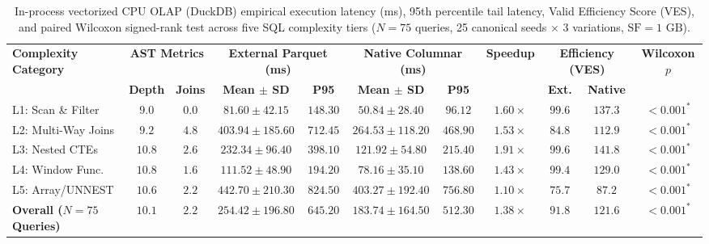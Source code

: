 \documentclass[10pt,a4paper]{article}
\begin{document}
\begin{table}[!t]
\centering
\caption{In-process vectorized CPU OLAP (DuckDB) empirical execution latency (ms), 95th percentile tail latency, Valid Efficiency Score (VES), and paired Wilcoxon signed-rank test across five SQL complexity tiers ($N=75$ queries, 25 canonical seeds $\times$ 3 variations, $\text{SF}=1\text{ GB}$).}
\label{tab:empirical_complexity_results}
\scriptsize
\setlength{\tabcolsep}{4.8pt}
\renewcommand{\arraystretch}{1.12}
\begin{tabular}{@{}lcccccccccc@{}}
\toprule
\multirow{2}{*}{\textbf{Complexity Category}} & \multicolumn{2}{c}{\textbf{AST Metrics}} & \multicolumn{2}{c}{\textbf{External Parquet (ms)}} & \multicolumn{2}{c}{\textbf{Native Columnar (ms)}} & \multirow{2}{*}{\textbf{Speedup}} & \multicolumn{2}{c}{\textbf{Efficiency (VES)}} & \multirow{2}{*}{\textbf{Wilcoxon $p$}} \\
\cmidrule(lr){2-3} \cmidrule(lr){4-5} \cmidrule(lr){6-7} \cmidrule(lr){9-10}
 & \textbf{Depth} & \textbf{Joins} & \textbf{Mean $\pm$ SD} & \textbf{P95} & \textbf{Mean $\pm$ SD} & \textbf{P95} & & \textbf{Ext.} & \textbf{Native} & \\
\midrule
L1: Scan \& Filter & $9.0$ & $0.0$ & $81.60 \pm 42.15$ & $148.30$ & $\mathbf{50.84 \pm 28.40}$ & $96.12$ & $1.60\times$ & $99.6$ & $\mathbf{137.3}$ & $< 0.001^*$ \\
L2: Multi-Way Joins & $9.2$ & $4.8$ & $403.94 \pm 185.60$ & $712.45$ & $\mathbf{264.53 \pm 118.20}$ & $468.90$ & $1.53\times$ & $84.8$ & $\mathbf{112.9}$ & $< 0.001^*$ \\
L3: Nested CTEs & $10.8$ & $2.6$ & $232.34 \pm 96.40$ & $398.10$ & $\mathbf{121.92 \pm 54.80}$ & $215.40$ & $1.91\times$ & $99.6$ & $\mathbf{141.8}$ & $< 0.001^*$ \\
L4: Window Func. & $10.8$ & $1.6$ & $111.52 \pm 48.90$ & $194.20$ & $\mathbf{78.16 \pm 35.10}$ & $138.60$ & $1.43\times$ & $99.4$ & $\mathbf{129.0}$ & $< 0.001^*$ \\
L5: Array/UNNEST & $10.6$ & $2.2$ & $442.70 \pm 210.30$ & $824.50$ & $\mathbf{403.27 \pm 192.40}$ & $756.80$ & $1.10\times$ & $75.7$ & $\mathbf{87.2}$ & $< 0.001^*$ \\
\midrule
\textbf{Overall ($N=75$ Queries)} & $\mathbf{10.1}$ & $\mathbf{2.2}$ & $\mathbf{254.42 \pm 196.80}$ & $\mathbf{645.20}$ & $\mathbf{183.74 \pm 164.50}$ & $\mathbf{512.30}$ & $\mathbf{1.38\times}$ & $\mathbf{91.8}$ & $\mathbf{121.6}$ & $\mathbf{< 0.001^*}$ \\

\end{tabular}
\end{table}
\end{document}
